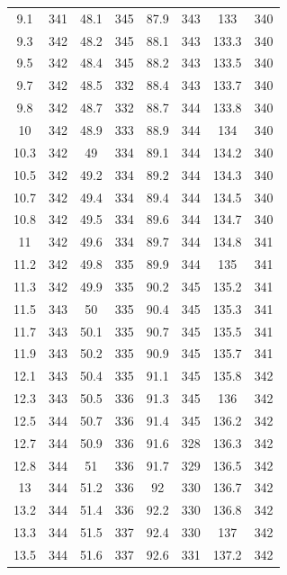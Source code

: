 \documentclass[12pt]{ctexart}
\numberwithin{equation}{section}
\begin{document}
\begin{longtable}{cc|cc|cc|cc}
9.1  &  341  &  48.1  &  345  &  87.9  &  343  &  133  &  340  \\
9.3  &  342  &  48.2  &  345  &  88.1  &  343  &  133.3  &  340  \\
9.5  &  342  &  48.4  &  345  &  88.2  &  343  &  133.5  &  340  \\
9.7  &  342  &  48.5  &  332  &  88.4  &  343  &  133.7  &  340  \\
9.8  &  342  &  48.7  &  332  &  88.7  &  344  &  133.8  &  340  \\
10  &  342  &  48.9  &  333  &  88.9  &  344  &  134  &  340  \\
10.3  &  342  &  49  &  334  &  89.1  &  344  &  134.2  &  340  \\
10.5  &  342  &  49.2  &  334  &  89.2  &  344  &  134.3  &  340  \\
10.7  &  342  &  49.4  &  334  &  89.4  &  344  &  134.5  &  340  \\
10.8  &  342  &  49.5  &  334  &  89.6  &  344  &  134.7  &  340  \\
11  &  342  &  49.6  &  334  &  89.7  &  344  &  134.8  &  341  \\
11.2  &  342  &  49.8  &  335  &  89.9  &  344  &  135  &  341  \\
11.3  &  342  &  49.9  &  335  &  90.2  &  345  &  135.2  &  341  \\
11.5  &  343  &  50  &  335  &  90.4  &  345  &  135.3  &  341  \\
11.7  &  343  &  50.1  &  335  &  90.7  &  345  &  135.5  &  341  \\
11.9  &  343  &  50.2  &  335  &  90.9  &  345  &  135.7  &  341  \\
12.1  &  343  &  50.4  &  335  &  91.1  &  345  &  135.8  &  342  \\
12.3  &  343  &  50.5  &  336  &  91.3  &  345  &  136  &  342  \\
12.5  &  344  &  50.7  &  336  &  91.4  &  345  &  136.2  &  342  \\
12.7  &  344  &  50.9  &  336  &  91.6  &  328  &  136.3  &  342  \\
12.8  &  344  &  51  &  336  &  91.7  &  329  &  136.5  &  342  \\
13  &  344  &  51.2  &  336  &  92  &  330  &  136.7  &  342  \\
13.2  &  344  &  51.4  &  336  &  92.2  &  330  &  136.8  &  342  \\
13.3  &  344  &  51.5  &  337  &  92.4  &  330  &  137  &  342  \\
13.5  &  344  &  51.6  &  337  &  92.6  &  331  &  137.2  &  342  \\

\end{longtable}
\end{document}
